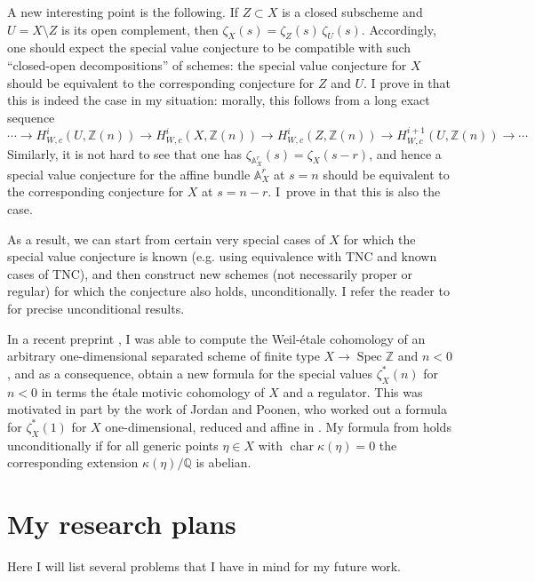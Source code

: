 \documentclass{article}
\DeclareMathOperator{\Spec}{Spec}
\newcommand{\ZZ}{\mathbb{Z}}
\newcommand{\QQ}{\mathbb{Q}}
\renewcommand{\AA}{\mathbb{A}}
\begin{document}
A new interesting point is the following. If $Z \subset X$ is a closed subscheme
and $U = X\setminus Z$ is its open complement, then
$\zeta_X (s) = \zeta_Z (s) \, \zeta_U (s)$. Accordingly, one should expect the
special value conjecture to be compatible with such ``closed-open
decompositions'' of schemes: the special value conjecture for $X$ should be
equivalent to the corresponding conjecture for $Z$ and $U$. I prove in
\cite{Weil-etale-zeta-values} that this is indeed the case in my situation:
morally, this follows from a long exact sequence
\[ \cdots \to H^i_{W,c} (U,\ZZ(n)) \to H^i_{W,c} (X,\ZZ(n)) \to H^i_{W,c} (Z,\ZZ(n)) \to H^{i+1}_{W,c} (U,\ZZ(n)) \to \cdots \]
Similarly, it is not hard to see that one has
$\zeta_{\AA^r_X} (s) = \zeta_X (s-r)$, and hence a special value conjecture for
the affine bundle $\AA^r_X$ at $s = n$ should be equivalent to the corresponding
conjecture for $X$ at $s = n-r$. I~prove in \cite{Weil-etale-zeta-values} that
this is also the case.

As a result, we can start from certain very special cases of $X$ for which the
special value conjecture is known (e.g. using equivalence with TNC and known
cases of TNC), and then construct new schemes (not necessarily proper or
regular) for which the conjecture also holds, unconditionally. I refer the
reader to \cite{Weil-etale-zeta-values} for precise unconditional results.

In a recent preprint \cite{Weil-etale-1-dim}, I was able to compute the
Weil-étale cohomology of an arbitrary one-dimensional separated scheme of finite
type $X \to \Spec \ZZ$ and $n < 0$, and as a consequence, obtain a new formula
for the special values $\zeta_X^* (n)$ for $n < 0$ in terms the étale motivic
cohomology of $X$ and a regulator. This was motivated in part by the work of
Jordan and Poonen, who worked out a formula for $\zeta_X^* (1)$ for $X$
one-dimensional, reduced and affine in \cite{Jordan-Poonen-2020}.  My formula
from \cite{Weil-etale-1-dim} holds unconditionally if for all generic points
$\eta \in X$ with $\operatorname{char} \kappa (\eta) = 0$ the corresponding
extension $\kappa (\eta) / \QQ$ is abelian.

\section{My research plans}

Here I will list several problems that I have in mind for my future work.
\end{document}
